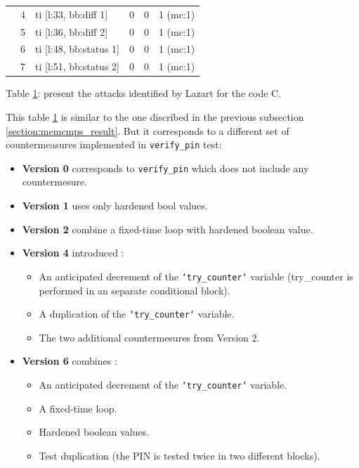 \begin{table}[ht]
{\begin{tabular}{l|l|l|l|l|l}
                    & 4  & ti [l:33, bb:diff 1]                       & 0       & 0         & 1 (mc:1)    \\
                    & 5  & ti [l:36, bb:diff 2]                       & 0       & 0         & 1 (mc:1)    \\
                    & 6  & ti [l:48, bb:status 1]                     & 0       & 0         & 1 (mc:1)    \\
                    & 7  & ti [l:51, bb:status 2]                     & 0       & 0         & 1 (mc:1)    \\
            \bottomrule
        \end{tabular}
    }
    \label{tab3:verifypin_C}
\end{table}
\noindent Table \ref{tab3:verifypin_C}: present the attacks identified by Lazart for the code C.

This table \ref{tab3:verifypin_C} is similar to the one discribed in the previous subsection \ref{section:memcmps_result}.
But it corresponds to a different set of countermeasures implemented in \texttt{verify\_pin} test:
\begin{itemize}
        \item \textbf{Version 0} corresponds to \texttt{verify\_pin} which does not include any countermesure.
        \item \textbf{Version 1} uses only hardened bool values.
        \item \textbf{Version 2} combine a fixed-time loop with hardened boolean value.
        \item \textbf{Version 4} introduced :
        \begin{itemize}
                \item An anticipated decrement of the \texttt{`try\_counter`} variable (try\_counter is performed in an separate conditional block).
                \item A duplication of the \texttt{`try\_counter`} variable.
                \item The two additional countermesures from Version 2.
        \end{itemize}
        \item \textbf{Version 6} combines :
        \begin{itemize}
                \item An anticipated decrement of the \texttt{`try\_counter`} variable.
                \item A fixed-time loop.
                \item Hardened boolean values.
                \item Test duplication (the PIN is tested twice in two different blocks).
        \end{itemize} 
\end{itemize}

